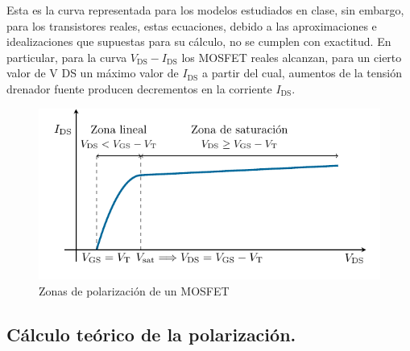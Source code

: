 \documentclass[11pt,a4paper]{article}
\begin{document}
		Esta es la curva representada para los modelos estudiados en clase, sin embargo, para los transistores reales, estas ecuaciones, debido a las aproximaciones e idealizaciones que supuestas para su cálculo, no se cumplen con exactitud. En particular, para la curva $V_\mathrm{DS}-I_\mathrm{DS}$ los MOSFET reales alcanzan, para un cierto valor de V DS un máximo valor de $I_\mathrm{DS}$ a partir del cual, aumentos de la tensión drenador fuente producen decrementos en la corriente $I_\mathrm{DS}$.

    \begin{figure}[!hbt]
      \centering
      \includegraphics[width=0.8\columnwidth]{figuras/mosfet-curva}
      \caption{Zonas de polarización de un MOSFET}
      \label{zonas_mosfet}
    \end{figure}



	\subsection{Cálculo teórico de la polarización.}
\end{document}
